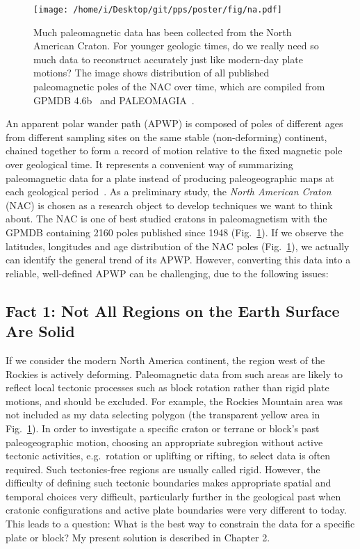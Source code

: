 \begin{figure}
\centering
\texttt{[image: /home/i/Desktop/git/pps/poster/fig/na.pdf]}
\captionsetup{width=.95\textwidth}
\caption{Much paleomagnetic data has been collected from the North American
Craton. For younger geologic times, do we really need so much data to
reconstruct accurately just like modern-day plate motions? The image shows
distribution of all published paleomagnetic poles of the NAC over time, which
are compiled from GPMDB 4.6b~\cite{P05} and
PALEOMAGIA~\cite{V14}.}\label{Fig:chap_intro_nacpole}
\end{figure}

An apparent polar wander path (APWP) is composed of poles of different ages
from different sampling sites on the same stable (non-deforming) continent,
chained together to form a record of motion relative to the fixed magnetic pole
over geological time. It represents a convenient way of summarizing
paleomagnetic data for a plate instead of producing paleogeographic maps at
each geological period~\cite{T08}. As a preliminary study, the \emph{North
American Craton} (NAC) is chosen as a research object to develop techniques we
want to think about. The NAC is one of best studied cratons in paleomagnetism
with the GPMDB containing 2160 poles published since 1948
(Fig.~\ref{Fig:chap_intro_nacpole}). If we observe the latitudes, longitudes and
age distribution of the NAC poles (Fig.~\ref{Fig:chap_intro_nacpole}), we
actually can identify the general trend of its APWP\@. However, converting this
data into a reliable, well-defined APWP can be challenging, due to the following
issues:

\subsection{Fact 1: Not All Regions on the Earth Surface Are Solid}

If we consider the modern North America continent, the region west of the
Rockies is actively deforming. Paleomagnetic data from such areas are likely to
reflect local tectonic processes such as block rotation rather than rigid plate
motions, and should be excluded. For example, the Rockies Mountain area was not
included as my data selecting polygon (the transparent yellow area in
Fig.~\ref{Fig:chap_intro_nacpole}). In order to investigate a specific craton or
terrane or block's past paleogeographic motion, choosing an appropriate
subregion without active tectonic activities, e.g.\ rotation or uplifting or
rifting, to select data is often required. Such tectonics-free regions are
usually called rigid. However, the difficulty of defining such tectonic
boundaries makes appropriate spatial and temporal choices very difficult,
particularly further in the geological past when cratonic configurations and
active plate boundaries were very different to today. This leads to a question:
What is the best way to constrain the data for a specific plate or block? My
present solution is described in Chapter 2.

